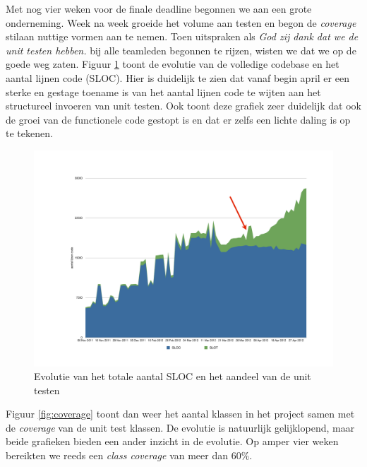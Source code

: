 \documentclass[12pt,a4paper]{report}
\begin{document}
Met nog vier weken voor de finale deadline begonnen we aan een grote onderneming. Week na week groeide het volume aan testen en begon de \emph{coverage} stilaan nuttige vormen aan te nemen. Toen uitspraken als \emph{God zij dank dat we de unit testen hebben.} bij alle teamleden begonnen te rijzen, wisten we dat we op de goede weg zaten. Figuur \ref{fig:sloc} toont de evolutie van de volledige codebase en het aantal lijnen code (SLOC). Hier is duidelijk te zien dat vanaf begin april er een sterke en gestage toename is van het aantal lijnen code te wijten aan het structureel invoeren van unit testen. Ook toont deze grafiek zeer duidelijk dat ook de groei van de functionele code gestopt is en dat er zelfs een lichte daling is op te tekenen.

\begin{figure}[htbp]
  \centering
  \includegraphics[width=125mm]{resources/sloc.pdf}
  \caption{Evolutie van het totale aantal SLOC en het aandeel van de unit testen}
  \label{fig:sloc}
\end{figure}

Figuur \ref{fig:coverage} toont dan weer het aantal klassen in het project samen met de \emph{coverage} van de unit test klassen. De evolutie is natuurlijk gelijklopend, maar beide grafieken bieden een ander inzicht in de evolutie. Op amper vier weken bereikten we reeds een \emph{class coverage} van meer dan 60\%.
\end{document}
